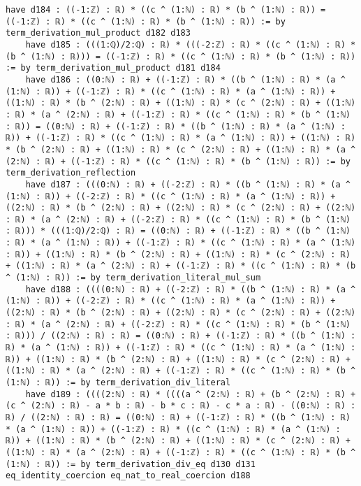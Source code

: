 \documentclass{article}
\begin{document}
\begin{tcolorbox}[colback=white!10, width=\linewidth]
\begin{lstlisting}[language=Lean4]
    have d184 : ((-1:ℤ) : ℝ) * ((c ^ (1:ℕ) : ℝ) * (b ^ (1:ℕ) : ℝ)) = ((-1:ℤ) : ℝ) * ((c ^ (1:ℕ) : ℝ) * (b ^ (1:ℕ) : ℝ)) := by term_derivation_mul_product d182 d183
    have d185 : (((1:ℚ)/2:ℚ) : ℝ) * (((-2:ℤ) : ℝ) * ((c ^ (1:ℕ) : ℝ) * (b ^ (1:ℕ) : ℝ))) = ((-1:ℤ) : ℝ) * ((c ^ (1:ℕ) : ℝ) * (b ^ (1:ℕ) : ℝ)) := by term_derivation_mul_product d181 d184
    have d186 : ((0:ℕ) : ℝ) + ((-1:ℤ) : ℝ) * ((b ^ (1:ℕ) : ℝ) * (a ^ (1:ℕ) : ℝ)) + ((-1:ℤ) : ℝ) * ((c ^ (1:ℕ) : ℝ) * (a ^ (1:ℕ) : ℝ)) + ((1:ℕ) : ℝ) * (b ^ (2:ℕ) : ℝ) + ((1:ℕ) : ℝ) * (c ^ (2:ℕ) : ℝ) + ((1:ℕ) : ℝ) * (a ^ (2:ℕ) : ℝ) + ((-1:ℤ) : ℝ) * ((c ^ (1:ℕ) : ℝ) * (b ^ (1:ℕ) : ℝ)) = ((0:ℕ) : ℝ) + ((-1:ℤ) : ℝ) * ((b ^ (1:ℕ) : ℝ) * (a ^ (1:ℕ) : ℝ)) + ((-1:ℤ) : ℝ) * ((c ^ (1:ℕ) : ℝ) * (a ^ (1:ℕ) : ℝ)) + ((1:ℕ) : ℝ) * (b ^ (2:ℕ) : ℝ) + ((1:ℕ) : ℝ) * (c ^ (2:ℕ) : ℝ) + ((1:ℕ) : ℝ) * (a ^ (2:ℕ) : ℝ) + ((-1:ℤ) : ℝ) * ((c ^ (1:ℕ) : ℝ) * (b ^ (1:ℕ) : ℝ)) := by term_derivation_reflection
    have d187 : (((0:ℕ) : ℝ) + ((-2:ℤ) : ℝ) * ((b ^ (1:ℕ) : ℝ) * (a ^ (1:ℕ) : ℝ)) + ((-2:ℤ) : ℝ) * ((c ^ (1:ℕ) : ℝ) * (a ^ (1:ℕ) : ℝ)) + ((2:ℕ) : ℝ) * (b ^ (2:ℕ) : ℝ) + ((2:ℕ) : ℝ) * (c ^ (2:ℕ) : ℝ) + ((2:ℕ) : ℝ) * (a ^ (2:ℕ) : ℝ) + ((-2:ℤ) : ℝ) * ((c ^ (1:ℕ) : ℝ) * (b ^ (1:ℕ) : ℝ))) * (((1:ℚ)/2:ℚ) : ℝ) = ((0:ℕ) : ℝ) + ((-1:ℤ) : ℝ) * ((b ^ (1:ℕ) : ℝ) * (a ^ (1:ℕ) : ℝ)) + ((-1:ℤ) : ℝ) * ((c ^ (1:ℕ) : ℝ) * (a ^ (1:ℕ) : ℝ)) + ((1:ℕ) : ℝ) * (b ^ (2:ℕ) : ℝ) + ((1:ℕ) : ℝ) * (c ^ (2:ℕ) : ℝ) + ((1:ℕ) : ℝ) * (a ^ (2:ℕ) : ℝ) + ((-1:ℤ) : ℝ) * ((c ^ (1:ℕ) : ℝ) * (b ^ (1:ℕ) : ℝ)) := by term_derivation_literal_mul_sum
    have d188 : ((((0:ℕ) : ℝ) + ((-2:ℤ) : ℝ) * ((b ^ (1:ℕ) : ℝ) * (a ^ (1:ℕ) : ℝ)) + ((-2:ℤ) : ℝ) * ((c ^ (1:ℕ) : ℝ) * (a ^ (1:ℕ) : ℝ)) + ((2:ℕ) : ℝ) * (b ^ (2:ℕ) : ℝ) + ((2:ℕ) : ℝ) * (c ^ (2:ℕ) : ℝ) + ((2:ℕ) : ℝ) * (a ^ (2:ℕ) : ℝ) + ((-2:ℤ) : ℝ) * ((c ^ (1:ℕ) : ℝ) * (b ^ (1:ℕ) : ℝ))) / ((2:ℕ) : ℝ) : ℝ) = ((0:ℕ) : ℝ) + ((-1:ℤ) : ℝ) * ((b ^ (1:ℕ) : ℝ) * (a ^ (1:ℕ) : ℝ)) + ((-1:ℤ) : ℝ) * ((c ^ (1:ℕ) : ℝ) * (a ^ (1:ℕ) : ℝ)) + ((1:ℕ) : ℝ) * (b ^ (2:ℕ) : ℝ) + ((1:ℕ) : ℝ) * (c ^ (2:ℕ) : ℝ) + ((1:ℕ) : ℝ) * (a ^ (2:ℕ) : ℝ) + ((-1:ℤ) : ℝ) * ((c ^ (1:ℕ) : ℝ) * (b ^ (1:ℕ) : ℝ)) := by term_derivation_div_literal
    have d189 : ((((2:ℕ) : ℝ) * ((((a ^ (2:ℕ) : ℝ) + (b ^ (2:ℕ) : ℝ) + (c ^ (2:ℕ) : ℝ) - a * b : ℝ) - b * c : ℝ) - c * a : ℝ) - ((0:ℕ) : ℝ) : ℝ) / ((2:ℕ) : ℝ) : ℝ) = ((0:ℕ) : ℝ) + ((-1:ℤ) : ℝ) * ((b ^ (1:ℕ) : ℝ) * (a ^ (1:ℕ) : ℝ)) + ((-1:ℤ) : ℝ) * ((c ^ (1:ℕ) : ℝ) * (a ^ (1:ℕ) : ℝ)) + ((1:ℕ) : ℝ) * (b ^ (2:ℕ) : ℝ) + ((1:ℕ) : ℝ) * (c ^ (2:ℕ) : ℝ) + ((1:ℕ) : ℝ) * (a ^ (2:ℕ) : ℝ) + ((-1:ℤ) : ℝ) * ((c ^ (1:ℕ) : ℝ) * (b ^ (1:ℕ) : ℝ)) := by term_derivation_div_eq d130 d131 eq_identity_coercion eq_nat_to_real_coercion d188

\end{lstlisting}
\end{tcolorbox}
\end{document}
